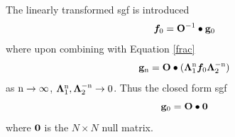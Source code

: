 \documentclass[a4paper, 12pt]{article}
\begin{document}
	The linearly transformed \gls{sgf} is introduced
	\begin{equation}\label{f}
		\bm f_0 = {\bf O}^{-1}\bullet {\bf g}_0
	\end{equation}
	where upon combining with Equation \eqref{frac}
	\begin{equation}\label{glam}
		{\bf g}_{\rm n} = {\bf O}\bullet(\bm\Lambda_1^{\rm n}\bm f_0\bm\Lambda_2^{-\rm n})
	\end{equation}
	as $\rm n\rightarrow\infty$, \quad $\bm\Lambda_1^{\rm n}, \bm\Lambda_2^{-\rm n}\rightarrow 0$. Thus the closed form \gls{sgf} 
\begin{equation}\label{SGF_AU}
	{\bf g}_0 = {\bf O} \bullet {\bf 0}
\end{equation}
where $\bf 0$ is the $N\times N$ null matrix.
\end{document}
